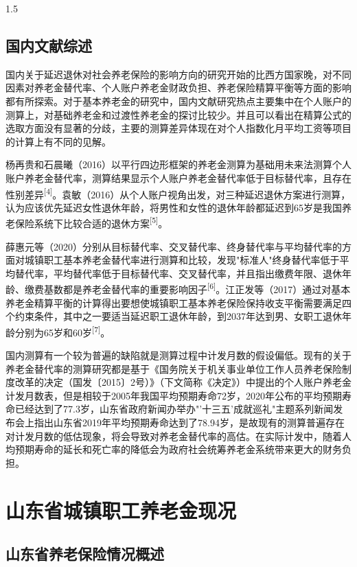 \documentclass[a4paper,12pt]{ctexart}
\numberwithin{equation}{section}
\begin{document}
\begin{spacing}{1.5}
\subsection{国内文献综述}

国内关于延迟退休对社会养老保险的影响方向的研究开始的比西方国家晚，对不同因素对养老金替代率、个人账户养老金财政负担、养老保险精算平衡等方面的影响都有所探索。对于基本养老金的研究中，国内文献研究热点主要集中在个人账户的测算上，对基础养老金和过渡性养老金的探讨比较少。并且可以看出在精算公式的选取方面没有显著的分歧，主要的测算差异体现在对个人指数化月平均工资等项目的计算上有不同的见解。

杨再贵和石晨曦（2016）以平行四边形框架的养老金测算为基础用未来法测算个人账户养老金替代率，测算结果显示个人账户养老金替代率低于目标替代率，且存在性别差异\textsuperscript{[4]}。袁敏（2016）从个人账户视角出发，对三种延迟退休方案进行测算，认为应该优先延迟女性退休年龄，将男性和女性的退休年龄都延迟到65岁是我国养老保险系统下比较合适的退休方案\textsuperscript{[5]}。

薛惠元等（2020）分别从目标替代率、交叉替代率、终身替代率与平均替代率的方面对城镇职工基本养老金替代率进行测算和比较，发现"标准人"终身替代率低于平均替代率，平均替代率低于目标替代率、交叉替代率，并且指出缴费年限、退休年龄、缴费基数都是养老金替代率的重要影响因子\textsuperscript{[6]}。江正发等（2017）通过对基本养老金精算平衡的计算得出要想使城镇职工基本养老保险保持收支平衡需要满足四个约束条件，其中之一要适当延迟职工退休年龄，到2037年达到男、女职工退休年龄分别为65岁和60岁\textsuperscript{[7]}。

国内测算有一个较为普遍的缺陷就是测算过程中计发月数的假设偏低。现有的关于养老金替代率的测算研究都是基于《国务院关于机关事业单位工作人员养老保险制度改革的决定（国发〔2015〕2号）》（下文简称《决定》）中提出的个人账户养老金计发月数表，但是相较于2005年我国平均预期寿命72岁，2020年公布的平均预期寿命已经达到了77.3岁，山东省政府新闻办举办"'十三五'成就巡礼"主题系列新闻发布会上指出山东省2019年平均预期寿命达到了78.94岁，是故现有的测算普遍存在对计发月数的低估现象，将会导致对养老金替代率的高估。在实际计发中，随着人均预期寿命的延长和死亡率的降低会为政府社会统筹养老金系统带来更大的财务负担。

\section{山东省城镇职工养老金现况}

\subsection{山东省养老保险情况概述}


\end{spacing}
\end{document}
